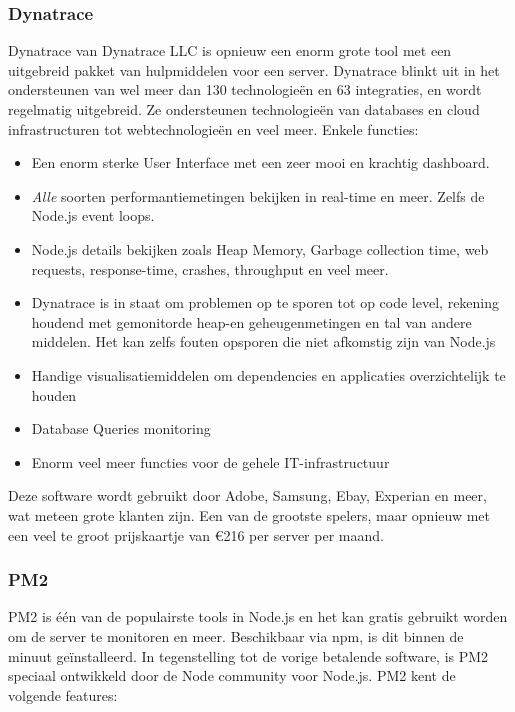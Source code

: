 \subsubsection{Dynatrace}
\label{sec:dynatrace}

Dynatrace van Dynatrace LLC is opnieuw een enorm grote tool met een uitgebreid pakket van hulpmiddelen voor een server. Dynatrace blinkt uit in het ondersteunen van wel meer dan 130 technologieën en 63 integraties, en wordt regelmatig uitgebreid. Ze ondersteunen technologieën van databases en cloud infrastructuren tot webtechnologieën en veel meer. Enkele functies:

\begin{itemize}
	\item Een enorm sterke User Interface met een zeer mooi en krachtig dashboard.
	\item \textit{Alle} soorten performantiemetingen bekijken in real-time en meer. Zelfs de Node.js event loops.
	\item Node.js details bekijken zoals Heap Memory, Garbage collection time, web requests, response-time, crashes, throughput en veel meer.
	\item Dynatrace is in staat om problemen op te sporen tot op code level, rekening houdend met gemonitorde heap-en geheugenmetingen en tal van andere middelen. Het kan zelfs fouten opsporen die niet afkomstig zijn van Node.js
	\item Handige visualisatiemiddelen om dependencies en applicaties overzichtelijk te houden
	\item Database Queries monitoring
	\item Enorm veel meer functies voor de gehele IT-infrastructuur
\end{itemize}

Deze software wordt gebruikt door Adobe, Samsung, Ebay, Experian en meer, wat meteen grote klanten zijn. Een van de grootste spelers, maar opnieuw met een veel te groot prijskaartje van \euro216 per server per maand.

\subsubsection{PM2}
\label{sec:pm2}

PM2 is één van de populairste tools in Node.js en het kan gratis gebruikt worden om de server te monitoren en meer. Beschikbaar via npm, is dit binnen de minuut geïnstalleerd. In tegenstelling tot de vorige betalende software, is PM2 speciaal ontwikkeld door de Node community voor Node.js. PM2 kent de volgende features:

